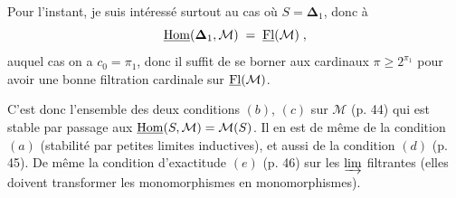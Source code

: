Pour l'instant, je suis intéressé surtout au cas où $S = \boldsymbol{\Delta}_{1}$, donc à
\[
\underline{\mathrm{Hom}}(\boldsymbol{\Delta}_{1},\mathcal{M}) \;=\; \underline{\mathrm{Fl}}(\mathcal{M}) \; ,
\]
auquel cas on a $c_{0} = \pi_{1}$, donc il suffit de se borner aux cardinaux $\pi \geq 2^{\pi_{1}}$ pour avoir une bonne filtration cardinale sur $\underline{\mathrm{Fl}}(\mathcal{M})$.

C'est donc l'ensemble des deux conditions $(b)$, $(c)$ sur $\mathcal{M}$ (p. 44) qui est stable par passage aux $\underline{\mathrm{Hom}}(S,\mathcal{M}) = \mathcal{M}(S)$. Il en est de même de la condition $(a)$ (stabilité par petites limites inductives), et aussi de la condition
$(d)$ (p. 45). De même la condition d'exactitude $(e)$ (p. 46) sur les $\varinjlim$ filtrantes (elles doivent transformer les monomorphismes en monomorphismes).

